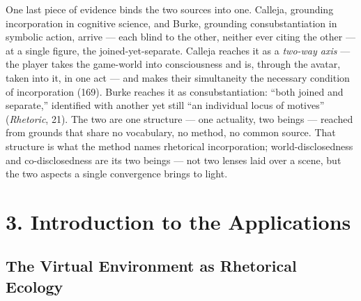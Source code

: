 \documentclass{article}
\begin{document}
One last piece of evidence binds the two sources into one. Calleja, grounding incorporation in cognitive science, and Burke, grounding consubstantiation in symbolic action, arrive — each blind to the other, neither ever citing the other — at a single figure, the joined-yet-separate. Calleja reaches it as a \textit{two-way axis} — the player takes the game-world into consciousness and is, through the avatar, taken into it, in one act — and makes their simultaneity the necessary condition of incorporation (169). Burke reaches it as consubstantiation: ``both joined and separate,'' identified with another yet still ``an individual locus of motives'' (\textit{Rhetoric}, 21). The two are one structure — one actuality, two beings — reached from grounds that share no vocabulary, no method, no common source. That structure is what the method names rhetorical incorporation; world-disclosedness and co-disclosedness are its two beings — not two lenses laid over a scene, but the two aspects a single convergence brings to light.

\bigskip

\bigskip

\section*{3. Introduction to the Applications}

\subsection*{The Virtual Environment as Rhetorical Ecology}
\end{document}
